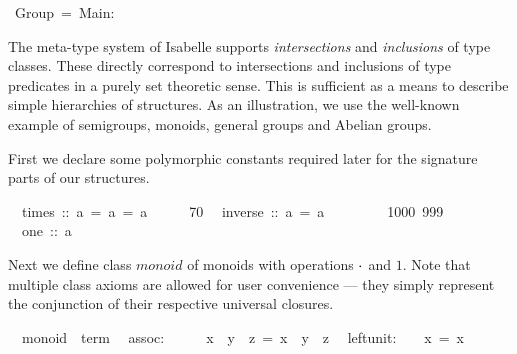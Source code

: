 \begin{isabelle}%
%
\ Group\ =\ Main:%
\begin{isamarkuptext}%
\medskip\noindent The meta-type system of Isabelle supports
 \emph{intersections} and \emph{inclusions} of type classes. These
 directly correspond to intersections and inclusions of type
 predicates in a purely set theoretic sense. This is sufficient as a
 means to describe simple hierarchies of structures.  As an
 illustration, we use the well-known example of semigroups, monoids,
 general groups and Abelian groups.%
\end{isamarkuptext}%
%
%
\begin{isamarkuptext}%
First we declare some polymorphic constants required later for the
 signature parts of our structures.%
\end{isamarkuptext}%
\isanewline
\ \ times\ ::\ {\isachardoublequote}{\isacharprime}a\ ={\isachargreater}\ {\isacharprime}a\ ={\isachargreater}\ {\isacharprime}a{\isachardoublequote}\ \ \ \ {\isacharparenleft}\ {\isachardoublequote}{\isasymOtimes}{\isachardoublequote}\ 70{\isacharparenright}\isanewline
\ \ inverse\ ::\ {\isachardoublequote}{\isacharprime}a\ ={\isachargreater}\ {\isacharprime}a{\isachardoublequote}\ \ \ \ \ \ \ \ {\isacharparenleft}{\isachardoublequote}{\isacharparenleft}{\isacharunderscore}{\isasyminv}{\isacharparenright}{\isachardoublequote}\ {\isacharbrackleft}1000{\isacharbrackright}\ 999{\isacharparenright}\isanewline
\ \ one\ ::\ {\isacharprime}a\ \ \ \ \ \ \ \ \ \ \ \ \ \ \ \ \ \ \ \ {\isacharparenleft}{\isachardoublequote}{\isasymunit}{\isachardoublequote}{\isacharparenright}%
\begin{isamarkuptext}%
\noindent Next we define class $monoid$ of monoids with operations
 $\cdot$ and $1$.  Note that multiple class axioms are allowed for
 user convenience --- they simply represent the conjunction of their
 respective universal closures.%
\end{isamarkuptext}%
\isanewline
\ \ monoid\ {\isacharless}\ {\isachardoublequote}term{\isachardoublequote}\isanewline
\ \ assoc:\ \ \ \ \ \ {\isachardoublequote}{\isacharparenleft}x\ {\isasymOtimes}\ y{\isacharparenright}\ {\isasymOtimes}\ z\ =\ x\ {\isasymOtimes}\ {\isacharparenleft}y\ {\isasymOtimes}\ z{\isacharparenright}{\isachardoublequote}\isanewline
\ \ left{\isacharunderscore}unit:\ \ {\isachardoublequote}{\isasymunit}\ {\isasymOtimes}\ x\ =\ x{\isachardoublequote}\isanewline

\end{isabelle}
